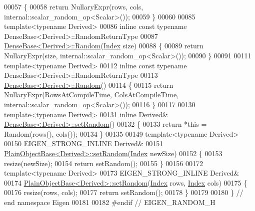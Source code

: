\begin{DoxyCode}
00057 \{
00058   \textcolor{keywordflow}{return} NullaryExpr(rows, cols, internal::scalar\_random\_op<Scalar>());
00059 \}
00060 
00085 \textcolor{keyword}{template}<\textcolor{keyword}{typename} Derived>
00086 \textcolor{keyword}{inline} \textcolor{keyword}{const} \textcolor{keyword}{typename} DenseBase<Derived>::RandomReturnType
00087 \hyperlink{group___core___module_ae814abb451b48ed872819192dc188c19}{DenseBase<Derived>::Random}(\hyperlink{namespace_eigen_a62e77e0933482dafde8fe197d9a2cfde}{Index} size)
00088 \{
00089   \textcolor{keywordflow}{return} NullaryExpr(size, internal::scalar\_random\_op<Scalar>());
00090 \}
00091 
00111 \textcolor{keyword}{template}<\textcolor{keyword}{typename} Derived>
00112 \textcolor{keyword}{inline} \textcolor{keyword}{const} \textcolor{keyword}{typename} DenseBase<Derived>::RandomReturnType
00113 \hyperlink{group___core___module_ae814abb451b48ed872819192dc188c19}{DenseBase<Derived>::Random}()
00114 \{
00115   \textcolor{keywordflow}{return} NullaryExpr(RowsAtCompileTime, ColsAtCompileTime, internal::scalar\_random\_op<Scalar>());
00116 \}
00117 
00130 \textcolor{keyword}{template}<\textcolor{keyword}{typename} Derived>
00131 \textcolor{keyword}{inline} Derived& \hyperlink{group___core___module_ac476e5852129ba32beaa1a8a3d7ee0db}{DenseBase<Derived>::setRandom}()
00132 \{
00133   \textcolor{keywordflow}{return} *\textcolor{keyword}{this} = Random(rows(), cols());
00134 \}
00135 
00149 \textcolor{keyword}{template}<\textcolor{keyword}{typename} Derived>
00150 EIGEN\_STRONG\_INLINE Derived&
00151 \hyperlink{class_eigen_1_1_plain_object_base_af0e576a0e1aefc9ee346de44cc352ba3}{PlainObjectBase<Derived>::setRandom}(\hyperlink{namespace_eigen_a62e77e0933482dafde8fe197d9a2cfde}{Index} newSize)
00152 \{
00153   resize(newSize);
00154   \textcolor{keywordflow}{return} setRandom();
00155 \}
00156 
00172 \textcolor{keyword}{template}<\textcolor{keyword}{typename} Derived>
00173 EIGEN\_STRONG\_INLINE Derived&
00174 \hyperlink{class_eigen_1_1_plain_object_base_af0e576a0e1aefc9ee346de44cc352ba3}{PlainObjectBase<Derived>::setRandom}(\hyperlink{namespace_eigen_a62e77e0933482dafde8fe197d9a2cfde}{Index} rows, 
      \hyperlink{namespace_eigen_a62e77e0933482dafde8fe197d9a2cfde}{Index} cols)
00175 \{
00176   resize(rows, cols);
00177   \textcolor{keywordflow}{return} setRandom();
00178 \}
00179 
00180 \} \textcolor{comment}{// end namespace Eigen}
00181 
00182 \textcolor{preprocessor}{#endif // EIGEN\_RANDOM\_H}
\end{DoxyCode}
